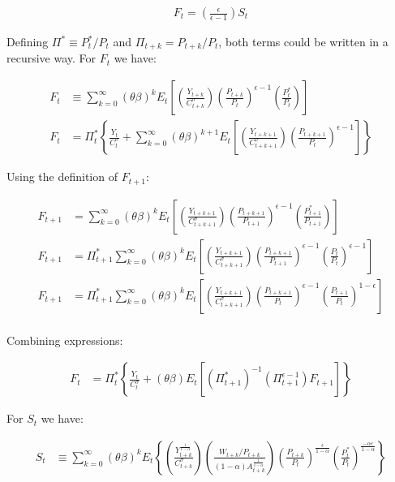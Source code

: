 \documentclass[11pt]{article}
\begin{document}
\begin{align*}
F_t=\left(\frac{\epsilon}{\epsilon-1}\right)S_t
\end{align*}

Defining $\Pi^*\equiv P_t^*/P_t$ and $\Pi_{t+k}=P_{t+k}/P_t$, both terms could be written in a recursive way. For $F_t$ we have:

\begin{align*}
F_t&\equiv\sum_{k=0}^{\infty}(\theta\beta)^k E_t\left[\left(\frac{Y_{t+k}}{C_{t+k}^{\sigma}}\right)\left(\frac{P_{t+k}}{P_{t}}\right)^{\epsilon-1}\left(\frac{P_t^*}{P_{t}}\right)\right]\\
F_t&=\Pi_t^*\left\{\frac{Y_{t}}{C_{t}^{\sigma}}+\sum_{k=0}^{\infty}(\theta\beta)^{k+1} E_t\left[\left(\frac{Y_{t+k+1}}{C_{t+k+1}^{\sigma}}\right)\left(\frac{P_{t+k+1}}{P_{t}}\right)^{\epsilon-1}\right]\right\}
\end{align*}

Using the definition of $F_{t+1}$:

\begin{align*}
F_{t+1}&=\sum_{k=0}^{\infty}(\theta\beta)^k E_t\left[\left(\frac{Y_{t+k+1}}{C_{t+k+1}^{\sigma}}\right)\left(\frac{P_{t+k+1}}{P_{t+1}}\right)^{\epsilon-1}\left(\frac{P_{t+1}^*}{P_{t+1}}\right)\right]\\
F_{t+1}&=\Pi_{t+1}^*\sum_{k=0}^{\infty}(\theta\beta)^k E_t\left[\left(\frac{Y_{t+k+1}}{C_{t+k+1}^{\sigma}}\right)\left(\frac{P_{t+k+1}}{P_{t+1}}\right)^{\epsilon-1}\left(\frac{P_{t}}{P_{t}}\right)^{\epsilon-1}\right]\\
F_{t+1}&=\Pi_{t+1}^*\sum_{k=0}^{\infty}(\theta\beta)^k E_t\left[\left(\frac{Y_{t+k+1}}{C_{t+k+1}^{\sigma}}\right)\left(\frac{P_{t+k+1}}{P_{t}}\right)^{\epsilon-1}\left(\frac{P_{t+1}}{P_{t}}\right)^{1-\epsilon}\right]\\
\end{align*}

Combining expressions:

\begin{align*}
F_t&=\Pi_t^*\left\{\frac{Y_{t}}{C_{t}^{\sigma}}+(\theta\beta)E_t[(\Pi_{t+1}^*)^{-1}(\Pi_{t+1}^{\epsilon-1})F_{t+1}]\right\}
\end{align*}

For $S_t$ we have:

\begin{align*}
S_t&\equiv\sum_{k=0}^{\infty}(\theta\beta)^k E_t\left\{ \left(\frac{Y_{t+k}^{\frac{1}{1-\alpha}}}{C_{t+k}^{\sigma}}\right)\left(\frac{W_{t+k}/P_{t+k}}{(1-\alpha)A_{t+k}^{\frac{1}{1-\alpha}}}\right)\left(\frac{P_{t+k}}{P_t}\right)^{\frac{\epsilon}{1-\alpha}}\left(\frac{P_{t}^*}{P_t}\right)^{\frac{-\alpha\epsilon}{1-\alpha}}\right\}\\
\end{align*}
\end{document}
